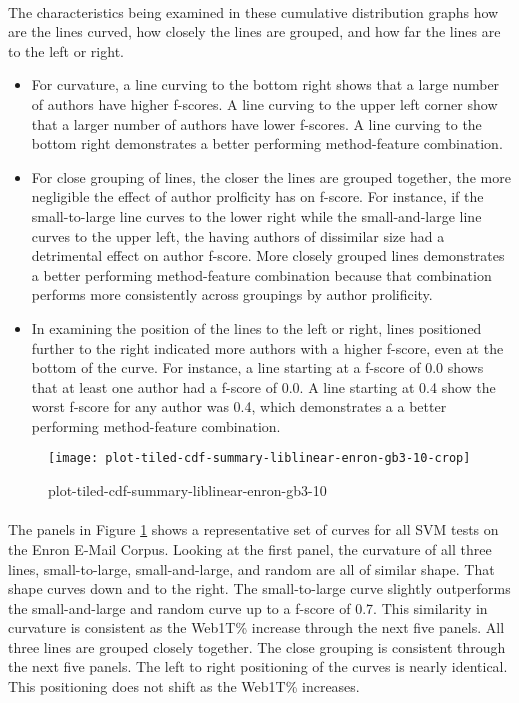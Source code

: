 	\paragraph*{} The characteristics being examined in these cumulative distribution graphs how are the lines curved, how closely the lines are grouped, and how far the lines are to the left or right.  
	\begin{itemize}
		\item For curvature, a line curving to the bottom right shows that a large number of authors have higher f-scores.  A line curving to the upper left corner show that a larger number of authors have lower f-scores.  A line curving to the bottom right demonstrates a better performing method-feature combination.  
		\item For close grouping of lines, the closer the lines are grouped together, the more negligible the effect of author prolficity has on f-score.  For instance, if the small-to-large line curves to the lower right while the small-and-large line curves to the upper left, the having authors of dissimilar size had a detrimental effect on author f-score.  More closely grouped lines demonstrates a better performing method-feature combination because that combination performs more consistently across groupings by author prolificity.  
		\item In examining the position of the lines to the left or right, lines positioned further to the right indicated more authors with a higher f-score, even at the bottom of the curve.  For instance, a line starting at a f-score of 0.0 shows that at least one author had a f-score of 0.0.  A line starting at 0.4 show the worst f-score for any author was 0.4, which demonstrates a a better performing method-feature combination.
	\end{itemize}
	
	\begin{figure}[htbp!]
		\begin{center}
		\centering
		\texttt{[image: plot-tiled-cdf-summary-liblinear-enron-gb3-10-crop]}
		\caption{plot-tiled-cdf-summary-liblinear-enron-gb3-10}
		\label{fig:plot-tiled-cdf-summary-liblinear-enron-gb3-10}
		\end{center}
	\end{figure}
	
	\paragraph*{}  The panels in Figure \ref{fig:plot-tiled-cdf-summary-liblinear-enron-gb3-10} shows a representative set of curves for all SVM tests on the Enron E-Mail Corpus.  Looking at the first panel, the curvature of all three lines, small-to-large, small-and-large, and random are all of similar shape.  That shape curves down and to the right. The small-to-large curve slightly outperforms the small-and-large and random curve up to a f-score of 0.7. This similarity in curvature is consistent as the Web1T\% increase through the next five panels. All three lines are grouped closely together.  The close grouping is consistent through the next five panels. The left to right positioning of the curves is nearly identical.  This positioning does not shift as the Web1T\% increases.
